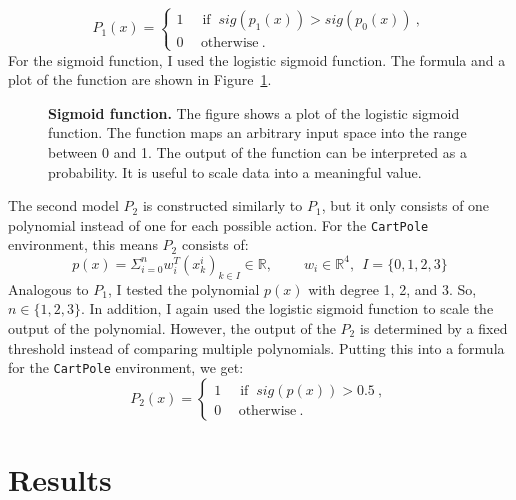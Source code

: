 \[
  P_1(x) =
  \begin{cases}1~&{\text{ if }}~sig(p_1(x)) > sig(p_0(x))~,\\0~&~\text{otherwise}~.\end{cases}
\]
For the sigmoid function, I used the logistic sigmoid function. The formula and a plot of the function are shown in Figure~\ref{fig:sigmoid}.

\begin{figure}[ht]
\centering
{}
\caption[Sigmoid function]{
  \textbf{Sigmoid function.}
  The figure shows a plot of the logistic sigmoid function. The function maps an arbitrary input space into the range between 0 and 1. The output of the function can be interpreted as a probability. It is useful to scale data into a meaningful value.
}
\label{fig:sigmoid}
\end{figure}


The second model $P_2$ is constructed similarly to $P_1$, but it only consists of one polynomial instead of one for each possible action. For the \verb|CartPole| environment, this means $P_2$ consists of:
\[
  p(x) = \Sigma_{i=0}^{n} w_i^T (x_k^i)_{k \in I} \in \mathbb{R}, \ \ \ \ \ \ \ \ \ \ w_i \in \mathbb{R}^4, \ \ I = \{0, 1, 2, 3\}
\]
Analogous to $P_1$, I tested the polynomial $p(x)$ with degree 1, 2, and 3. So, $n \in \{1, 2, 3\}$. In addition, I again used the logistic sigmoid function to scale the output of the polynomial. However, the output of the $P_2$ is determined by a fixed threshold instead of comparing multiple polynomials. Putting this into a formula for the \verb|CartPole| environment, we get:
\[
  P_2(x) =
  \begin{cases}1~&{\text{ if }}~sig(p(x))>0.5~,\\0~&~\text{otherwise}~.\end{cases}
\]


\section{Results}
